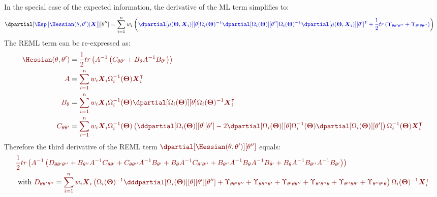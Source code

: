 \documentclass[12pt]{article}
\newcommand{\darkblue}{blue!80!black}
\newcommand{\darkred}{red!50!black}
\newcommand\trans[1]{{#1}^\intercal}%
\newcommand{\param}{\Theta}
\newcommand{\Vparam}{\boldsymbol{\param}}
\newcommand{\VX}{\boldsymbol{X}}
\begin{document}
In the special case of the expected information, the derivative of the ML term simplifies to:
\begin{align*}
\dpartial[\textcolor{\darkblue}{\Esp\left[\Hessian(\theta,\theta^{\prime})|\VX\right]}][\theta^{\prime\prime}]=
 \sum_{i=1}^n w_i & \left( \textcolor{\darkblue}{
\dpartial[\mu(\Vparam,\VX_i)][\theta] \Omega_i(\Vparam)^{-1} \dpartial[\Omega_i(\Vparam)][\theta^{\prime\prime}] \Omega_i(\Vparam)^{-1}   \trans{\dpartial[\mu(\Vparam,\VX_i)][\theta^{\prime}]}
+ \frac{1}{2} tr\left(\Upsilon_{\theta\theta^{\prime}\theta^{\prime\prime}} + \Upsilon_{\theta^{\prime}\theta\theta^{\prime\prime}} \right)
} \right)
\end{align*}
The REML term can be re-expressed as:
\begin{align*}
\textcolor{\darkred}{\Hessian(\theta,\theta^{\prime})} &= \textcolor{\darkred}{
\frac{1}{2} tr \left(A^{-1} \left( C_{\theta\theta^{\prime}} + B_{\theta}A^{-1} B_{\theta^{\prime}} \right)\right)
} \\
\textcolor{\darkred}{A} &= \textcolor{\darkred}{\sum_{i=1}^n w_i \VX_i \Omega_i^{-1}(\Vparam) \trans{\VX}_i }\\
\textcolor{\darkred}{B_{\theta}} &= \textcolor{\darkred}{\sum_{i=1}^n w_i \VX_i \Omega_i^{-1}(\Vparam) \dpartial[\Omega_i(\Vparam)][\theta] \Omega_i(\Vparam)^{-1} \trans{\VX}_i } \\
\textcolor{\darkred}{C_{\theta\theta^{\prime}}} &= \textcolor{\darkred}{\sum_{i=1}^n w_i \VX_i \Omega_i^{-1}(\Vparam)\left(\ddpartial[\Omega_i(\Vparam)][\theta][\theta^{\prime}] - 2 \dpartial[\Omega_i(\Vparam)][\theta]  \Omega_i^{-1}(\Vparam) \dpartial[\Omega_i(\Vparam)][\theta^{\prime}]\right) \Omega_i^{-1}(\Vparam) \trans{\VX}_i }
\end{align*}
Therefore the third derivative of the REML term \(\textcolor{\darkred}{\dpartial[\Hessian(\theta,\theta^{\prime})][\theta^{\prime\prime}]}\) equals: 
\begin{align*}
&\textcolor{\darkred}{
\frac{1}{2} tr \left(A^{-1} \left(
D_{\theta\theta^{\prime}\theta^{\prime\prime}} + B_{\theta^{\prime\prime}} A^{-1} C_{\theta\theta^{\prime}} + C_{\theta\theta^{\prime\prime}} A^{-1} B_{\theta^{\prime}} + B_{\theta}A^{-1} C_{\theta^{\prime}\theta^{\prime\prime}} + B_{\theta^{\prime\prime}}A^{-1}B_{\theta}A^{-1}B_{\theta^{\prime}} + B_{\theta}A^{-1}B_{\theta^{\prime\prime}}A^{-1}B_{\theta^{\prime}}
\right)\right) } \\
&\text{ with }\textcolor{\darkred}{D_{\theta\theta^{\prime}\theta^{\prime\prime}}} = \textcolor{\darkred}{\sum_{i=1}^n w_i \VX_i \left(
\Omega_i(\Vparam)^{-1} \dddpartial[\Omega_i(\Vparam)][\theta][\theta^{\prime}][\theta^{\prime\prime}]
+ \Upsilon_{\theta\theta^{\prime}\theta^{\prime\prime}}
+ \Upsilon_{\theta\theta^{\prime\prime}\theta^{\prime}}
+ \Upsilon_{\theta^{\prime}\theta\theta^{\prime\prime}}
+ \Upsilon_{\theta^{\prime}\theta^{\prime\prime}\theta}
+ \Upsilon_{\theta^{\prime\prime}\theta\theta^{\prime}}
+ \Upsilon_{\theta^{\prime\prime}\theta^{\prime}\theta}
\right)\Omega_i(\Vparam)^{-1}  \trans{\VX}_i }
\end{align*}
\end{document}
